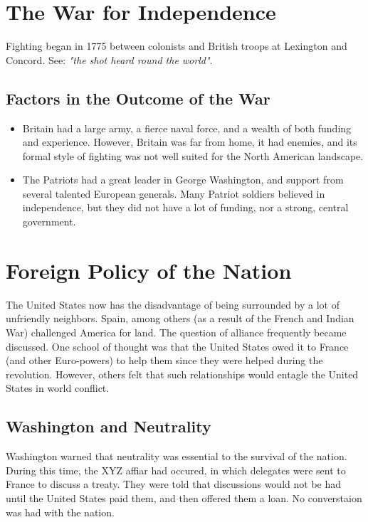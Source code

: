 \section{The War for Independence}
Fighting began in 1775 between colonists and British troops at Lexington and
Concord.  See: \textit{"the shot heard round the world"}.

\subsection{Factors in the Outcome of the War}
\begin{itemize}
  \item Britain had a large army, a fierce naval force, and a wealth of both
    funding and experience.  However, Britain was far from home, it had enemies,
    and its formal style of fighting was not well suited for the North American
    landscape.
  \item The Patriots had a great leader in George Washington, and support from
    several talented European generals.  Many Patriot soldiers believed in
    independence, but they did not have a lot of funding, nor a strong, central
    government.
\end{itemize}

\section{Foreign Policy of the Nation}
The United States now has the disadvantage of being surrounded by a lot of
unfriendly neighbors.  Spain, among others (as a result of the French and Indian
War) challenged America for land.  The question of alliance frequently became
discussed.  One school of thought was that the United States owed it to France
(and other Euro-powers) to help them since they were helped during the
revolution.  However, others felt that such relationships would entagle the
United States in world conflict.

\subsection{Washington and Neutrality}
Washington warned that neutrality was essential to the survival of the nation.
During this time, the XYZ affiar had occured, in which delegates were sent to
France to discuss a treaty.  They were told that discussions would not be had
until the United States paid them, and then offered them a loan.  No
converstaion was had with the nation.

